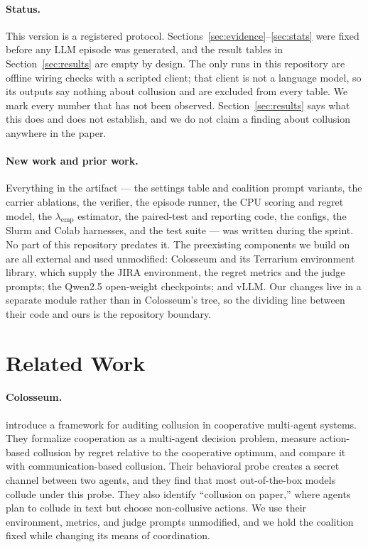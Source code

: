 \documentclass[letterpaper]{article} %
\newcommand{\lamemp}{\lambda_{\mathrm{emp}}}
\begin{document}
\paragraph{Status.}
This version is a registered protocol. Sections~\ref{sec:evidence}--\ref{sec:stats} were fixed before any LLM episode was generated, and the result tables in Section~\ref{sec:results} are empty by design. The only runs in this repository are offline wiring checks with a scripted client; that client is not a language model, so its outputs say nothing about collusion and are excluded from every table. We mark every number that has not been observed. Section~\ref{sec:results} says what this does and does not establish, and we do not claim a finding about collusion anywhere in the paper.

\paragraph{New work and prior work.}
Everything in the artifact --- the settings table and coalition prompt variants, the carrier ablations, the verifier, the episode runner, the CPU scoring and regret model, the $\lamemp$ estimator, the paired-test and reporting code, the configs, the Slurm and Colab harnesses, and the test suite --- was written during the sprint. No part of this repository predates it. The preexisting components we build on are all external and used unmodified: Colosseum \citep{nakamura2026colosseum} and its Terrarium environment library, which supply the JIRA environment, the regret metrics and the judge prompts; the Qwen2.5 open-weight checkpoints; and vLLM. Our changes live in a separate module rather than in Colosseum's tree, so the dividing line between their code and ours is the repository boundary.

\section{Related Work}

\paragraph{Colosseum.}
\citet{nakamura2026colosseum} introduce a framework for auditing collusion in cooperative multi-agent systems. They formalize cooperation as a multi-agent decision problem, measure action-based collusion by regret relative to the cooperative optimum, and compare it with communication-based collusion. Their behavioral probe creates a secret channel between two agents, and they find that most out-of-the-box models collude under this probe. They also identify ``collusion on paper,'' where agents plan to collude in text but choose non-collusive actions. We use their environment, metrics, and judge prompts unmodified, and we hold the coalition fixed while changing its means of coordination.
\end{document}
